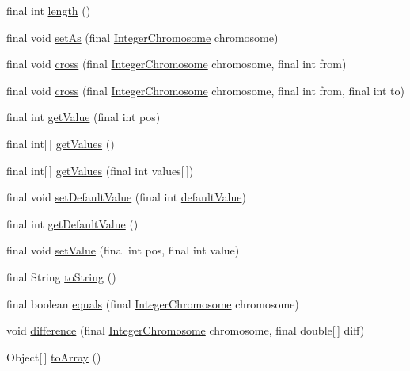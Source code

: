 \begin{DoxyCompactItemize}
\item 
final int \hyperlink{classjenes_1_1chromosome_1_1_integer_chromosome_a8e44ab8d05b2632e72c209c641f10073}{length} ()
\item 
final void \hyperlink{classjenes_1_1chromosome_1_1_integer_chromosome_a65b39a2a6ef3deb1cb107b7f474bcbb0}{set\-As} (final \hyperlink{classjenes_1_1chromosome_1_1_integer_chromosome}{Integer\-Chromosome} chromosome)
\item 
final void \hyperlink{classjenes_1_1chromosome_1_1_integer_chromosome_a36acf5fbdfbb8a2718ade474188248d4}{cross} (final \hyperlink{classjenes_1_1chromosome_1_1_integer_chromosome}{Integer\-Chromosome} chromosome, final int from)
\item 
final void \hyperlink{classjenes_1_1chromosome_1_1_integer_chromosome_adfb0865b40586caf2d78a7d2d58c7796}{cross} (final \hyperlink{classjenes_1_1chromosome_1_1_integer_chromosome}{Integer\-Chromosome} chromosome, final int from, final int to)
\item 
final int \hyperlink{classjenes_1_1chromosome_1_1_integer_chromosome_a5bc96e2224ca980bd9e13e0416426e1d}{get\-Value} (final int pos)
\item 
final int\mbox{[}$\,$\mbox{]} \hyperlink{classjenes_1_1chromosome_1_1_integer_chromosome_aa9e195726837440d8b65c9fc4268624c}{get\-Values} ()
\item 
final int\mbox{[}$\,$\mbox{]} \hyperlink{classjenes_1_1chromosome_1_1_integer_chromosome_adc4af1dfafa5c20d92ee91a79d289317}{get\-Values} (final int values\mbox{[}$\,$\mbox{]})
\item 
final void \hyperlink{classjenes_1_1chromosome_1_1_integer_chromosome_a682f03e84e51f0e132a657b25236d432}{set\-Default\-Value} (final int \hyperlink{classjenes_1_1chromosome_1_1_integer_chromosome_ace33eab850d5e617cf77b5374d73754f}{default\-Value})
\item 
final int \hyperlink{classjenes_1_1chromosome_1_1_integer_chromosome_aac608f3599a9289d510e0ee7bc34fbc9}{get\-Default\-Value} ()
\item 
final void \hyperlink{classjenes_1_1chromosome_1_1_integer_chromosome_a2d2aa7705d11a8ca21493c82bf334f74}{set\-Value} (final int pos, final int value)
\item 
final String \hyperlink{classjenes_1_1chromosome_1_1_integer_chromosome_aac7f634cd0b9449d2db45a87a0773ba3}{to\-String} ()
\item 
final boolean \hyperlink{classjenes_1_1chromosome_1_1_integer_chromosome_a58904190bf6c0d3f3b34dd584dab91b7}{equals} (final \hyperlink{classjenes_1_1chromosome_1_1_integer_chromosome}{Integer\-Chromosome} chromosome)
\item 
void \hyperlink{classjenes_1_1chromosome_1_1_integer_chromosome_a69f90fc799f3d0534bc32f6f509f89fc}{difference} (final \hyperlink{classjenes_1_1chromosome_1_1_integer_chromosome}{Integer\-Chromosome} chromosome, final double\mbox{[}$\,$\mbox{]} diff)
\item 
Object\mbox{[}$\,$\mbox{]} \hyperlink{classjenes_1_1chromosome_1_1_integer_chromosome_ac1fa490d6a64bcd765982f57235fb04a}{to\-Array} ()
\end{DoxyCompactItemize}
